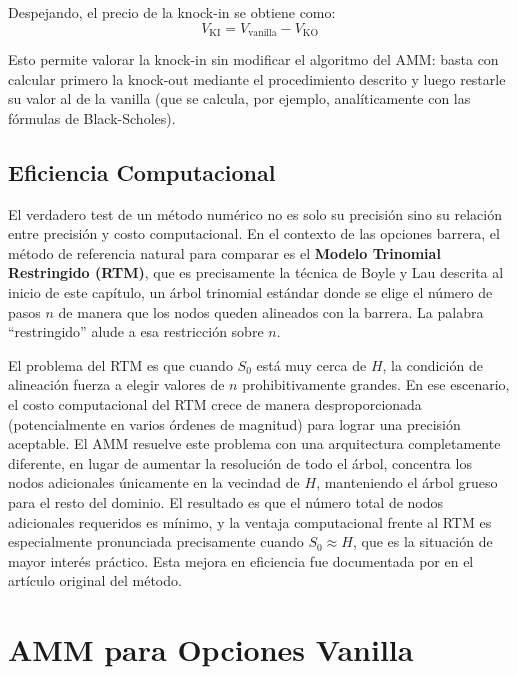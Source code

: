 Despejando, el precio de la knock-in se obtiene como:
\begin{equation}
V_{\text{KI}} = V_{\text{vanilla}} - V_{\text{KO}}
\end{equation}

Esto permite valorar la knock-in sin modificar el algoritmo del AMM: basta con calcular primero la knock-out mediante el procedimiento descrito y luego restarle su valor al de la vanilla (que se calcula, por ejemplo, analíticamente con las fórmulas de Black-Scholes).

\subsection{Eficiencia Computacional}

El verdadero test de un método numérico no es solo su precisión sino su relación entre precisión y costo computacional. En el contexto de las opciones barrera, el método de referencia natural para comparar es el \textbf{Modelo Trinomial Restringido (RTM)}, que es precisamente la técnica de Boyle y Lau descrita al inicio de este capítulo, un árbol trinomial estándar donde se elige el número de pasos $n$ de manera que los nodos queden alineados con la barrera. La palabra ``restringido'' alude a esa restricción sobre $n$.

El problema del RTM es que cuando $S_0$ está muy cerca de $H$, la condición de alineación fuerza a elegir valores de $n$ prohibitivamente grandes. En ese escenario, el costo computacional del RTM crece de manera desproporcionada (potencialmente en varios órdenes de magnitud) para lograr una precisión aceptable. El AMM resuelve este problema con una arquitectura completamente diferente, en lugar de aumentar la resolución de todo el árbol, concentra los nodos adicionales únicamente en la vecindad de $H$, manteniendo el árbol grueso para el resto del dominio. El resultado es que el número total de nodos adicionales requeridos es mínimo, y la ventaja computacional frente al RTM es especialmente pronunciada precisamente cuando $S_0 \approx H$, que es la situación de mayor interés práctico. Esta mejora en eficiencia fue documentada por \cite{figlewski1999adaptive} en el artículo original del método.

\section{AMM para Opciones Vanilla}
\label{sec:amm_vanilla}

